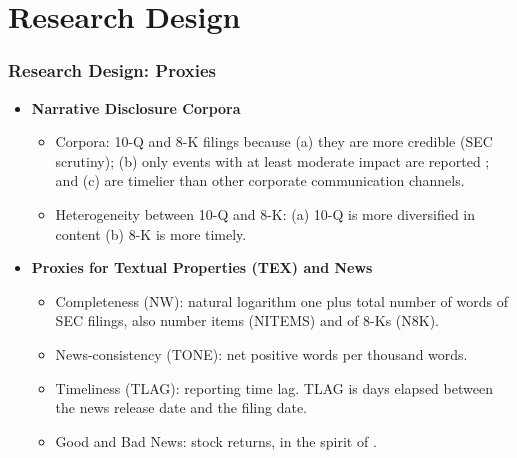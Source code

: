 \documentclass{beamer}
\begin{document}
\section{Research Design}
\begin{frame}
\frametitle{Research Design: Proxies}
\begin{itemize}

\item \textbf{Narrative Disclosure Corpora}

	\begin{itemize}
		\item Corpora: 10-Q and 8-K filings because (a) they are more credible (SEC scrutiny); (b) only events with at least moderate impact are reported \citep{hassanFirmLevelPoliticalRisk2019}; and (c) are timelier than other corporate communication channels.
		\item Heterogeneity between 10-Q and 8-K: (a) 10-Q is more diversified in content (b) 8-K is more timely.
	\end{itemize}

\medskip
\pause

\item \textbf{Proxies for Textual Properties (TEX) and News}
	\begin{itemize}
		\item Completeness (NW): natural logarithm one plus total number of words of SEC filings, also number items (NITEMS) and of 8-Ks (N8K). \pause
		\item News-consistency (TONE): net positive words per thousand words. \pause
		\item Timeliness (TLAG): reporting time lag. TLAG is days elapsed between the news release date and the filing date. \pause
		\item Good and Bad News: stock returns, in the spirit of \cite{basuConservatismPrincipleAsymmetric1997}.
	\end{itemize}

\end{itemize}
\end{frame}
\end{document}
